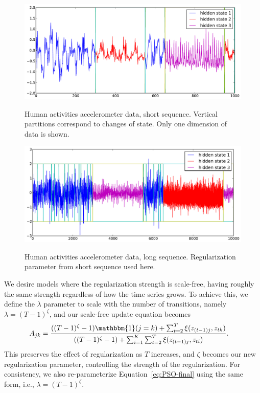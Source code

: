 \documentclass[letterpaper]{article}
\begin{document}
\begin{figure}[htbp]
  \caption{Human activities accelerometer data, short sequence. Vertical partitions correspond to changes of state. Only one dimension of data is shown.}
  \centering
    \includegraphics[width=0.8\linewidth]{images/MAP_results_hard_activity_short_3_states.pdf}
    \label{fig:short-real-data}
\end{figure}

\begin{figure}[htbp]
  \caption{Human activities accelerometer data, long sequence. Regularization parameter from short sequence used here.}
  \centering
    \includegraphics[width=0.8\linewidth]{images/MAP_results_hard_activity_long_3_states.pdf}
    \label{fig:long-real-data}
\end{figure}

We desire models where the regularization strength is scale-free, having roughly the same strength regardless of how the time series grows. To achieve this, we define the $\lambda$ parameter to scale with the number of transitions, namely $\lambda = (T-1)^\zeta$, and our scale-free update equation becomes
{\tiny
\begin{align}\label{eq:SCALE-FREE-MAP}
    A_{jk} &= \frac{((T - 1)^{\zeta}-1){\mathbbm{1}(j = k)} + \sum_{t=2}^{T} \xi(z_{(t-1)j}, z_{tk})}   
    {((T - 1)^{\zeta} - 1) + \sum_{i=1}^{K}\sum_{t=2}^{T} \xi(z_{(t-1)j}, z_{ti})}.
\end{align}
}%
This preserves the effect of regularization as $T$ increases, and $\zeta$ becomes our new regularization parameter, controlling the strength of the regularization. For consistency, we also re-parameterize Equation~\ref{eq:PSO-final} using the same form, i.e., $\lambda = (T-1)^\zeta$.
\end{document}
